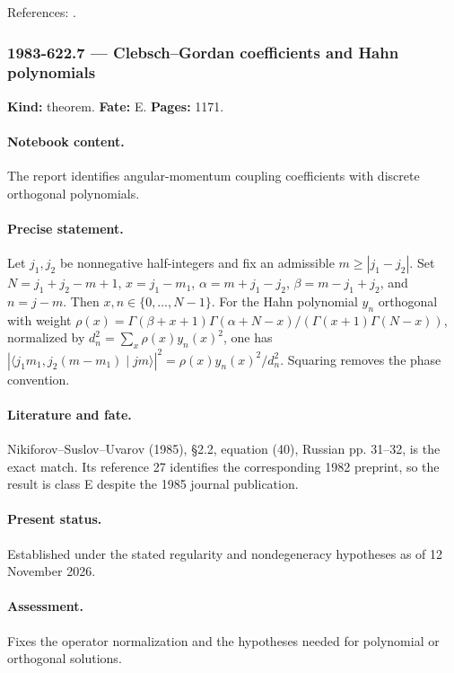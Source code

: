 \noindent References: \citep{nikiforovsuslovuvarov1991classical}.\par

\subsubsection{1983-622.7 --- Clebsch–Gordan coefficients and Hahn polynomials}

\label{item:1983-622.7}

\noindent\textbf{Kind:} theorem. \textbf{Fate:} E. \textbf{Pages:} 1171.\par

\paragraph{Notebook content.} The report identifies angular-momentum coupling coefficients with discrete orthogonal polynomials.

\paragraph{Precise statement.} Let \(j_1,j_2\) be nonnegative half-integers and fix an admissible \(m\ge|j_1-j_2|\). Set \(N=j_1+j_2-m+1\), \(x=j_1-m_1\), \(\alpha=m+j_1-j_2\), \(\beta=m-j_1+j_2\), and \(n=j-m\). Then \(x,n\in\{0,\ldots,N-1\}\). For the Hahn polynomial \(y_n\) orthogonal with weight \(\rho(x)=\Gamma(\beta+x+1)\Gamma(\alpha+N-x)/(\Gamma(x+1)\Gamma(N-x))\), normalized by \(d_n^2=\sum_x\rho(x)y_n(x)^2\), one has \(\left|\langle j_1m_1,j_2(m-m_1)\mid jm\rangle\right|^2=\rho(x)y_n(x)^2/d_n^2\). Squaring removes the phase convention.

\paragraph{Literature and fate.} Nikiforov–Suslov–Uvarov (1985), \S2.2, equation (40), Russian pp. 31–32, is the exact match. Its reference 27 identifies the corresponding 1982 preprint, so the result is class E despite the 1985 journal publication.

\paragraph{Present status.} Established under the stated regularity and nondegeneracy hypotheses as of 12 November 2026.

\paragraph{Assessment.} Fixes the operator normalization and the hypotheses needed for polynomial or orthogonal solutions.

